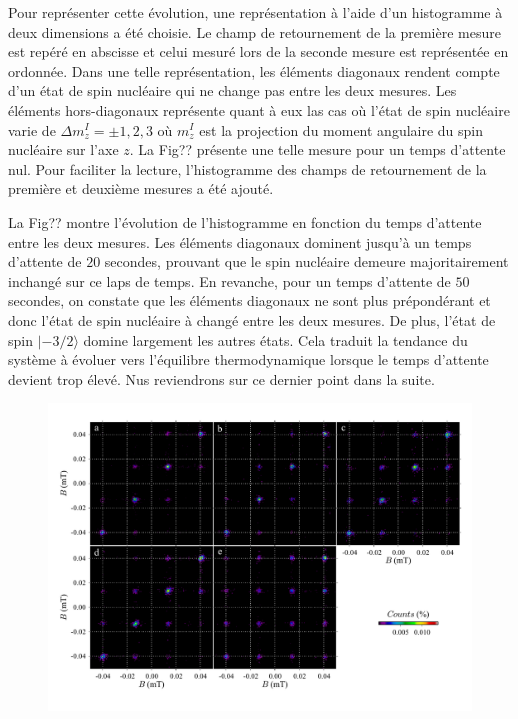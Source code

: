 Pour représenter cette évolution, une représentation à l'aide d'un histogramme à deux dimensions a été choisie. Le champ de retournement de la première mesure est repéré en abscisse et celui mesuré lors de la seconde mesure est représentée en ordonnée. Dans une telle représentation, les éléments diagonaux rendent compte d'un état de spin nucléaire qui ne change pas entre les deux mesures. Les éléments hors-diagonaux représente quant à eux las cas où l'état de spin nucléaire varie de $\Delta m_z^I = \pm 1,2,3$ où $m_z^I$ est la projection du moment angulaire du spin nucléaire sur l'axe $z$. La Fig?? présente une telle mesure pour un temps d'attente nul. Pour faciliter la lecture, l'histogramme des champs de retournement de la première et deuxième mesures a été ajouté.

La Fig?? montre l'évolution de l'histogramme en fonction du temps d'attente entre les deux mesures. Les éléments diagonaux dominent jusqu'à un temps d'attente de $20$ secondes, prouvant que le spin nucléaire demeure majoritairement inchangé sur ce laps de temps. En revanche, pour un temps d'attente de $50$ secondes, on constate que les éléments diagonaux ne sont plus prépondérant et donc l'état de spin nucléaire à changé entre les deux mesures. De plus, l'état de spin $|-3/2 \rangle$ domine largement les autres états. Cela traduit la tendance du système à évoluer vers l'équilibre thermodynamique lorsque le temps d'attente devient trop élevé. Nus reviendrons sur ce dernier point dans la suite.

\begin{figure}
\includegraphics[scale=0.45]{Resultats/Chap2/Figure2/figure2.pdf} 
\caption{}
\label{evolution_temps}
\end{figure}


